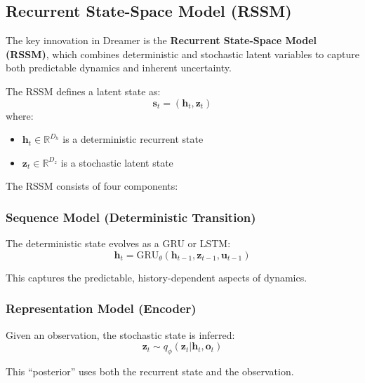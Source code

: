 \subsection{Recurrent State-Space Model (RSSM)}

The key innovation in Dreamer is the \textbf{Recurrent State-Space Model (RSSM)}, which combines deterministic and stochastic latent variables to capture both predictable dynamics and inherent uncertainty.

\begin{definition}
The RSSM defines a latent state as:
\begin{equation}
\mathbf{s}_t = (\mathbf{h}_t, \mathbf{z}_t)
\end{equation}
where:
\begin{itemize}
    \item $\mathbf{h}_t \in \mathbb{R}^{D_h}$ is a deterministic recurrent state
    \item $\mathbf{z}_t \in \mathbb{R}^{D_z}$ is a stochastic latent state
\end{itemize}
\end{definition}

The RSSM consists of four components:

\subsubsection{Sequence Model (Deterministic Transition)}

The deterministic state evolves as a GRU or LSTM:
\begin{equation}
\mathbf{h}_t = \text{GRU}_\theta(\mathbf{h}_{t-1}, \mathbf{z}_{t-1}, \mathbf{u}_{t-1})
\label{eq:rssm_deterministic}
\end{equation}

This captures the predictable, history-dependent aspects of dynamics.

\subsubsection{Representation Model (Encoder)}

Given an observation, the stochastic state is inferred:
\begin{equation}
\mathbf{z}_t \sim q_\phi(\mathbf{z}_t | \mathbf{h}_t, \mathbf{o}_t)
\label{eq:rssm_representation}
\end{equation}

This ``posterior'' uses both the recurrent state and the observation.

